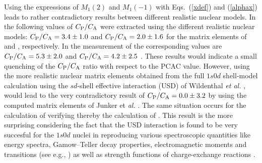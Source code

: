 \begin{multicols}{2}
Using the
expressions of $M_1(2)$ and $M_1(-1)$ with Eqs.\ (\ref{xdef}) and (\ref{alphax})
leads to rather contradictory results
between different realistic nuclear models. In \cite{bru} the following values
of $C_{\rm P}/C_{\rm A}$ were extracted using the different realistic
nuclear models: $C_{\rm P}/C_{\rm A} = 3.4\pm 1.0$ and
$C_{\rm P}/C_{\rm A} = 2.0\pm 1.6$ for the matrix elements of \cite{CIE76}
and \cite{PAR81}, respectively. In the measurement of \cite{MOF97}
the corresponding values are $C_{\rm P}/C_{\rm A} = 5.3\pm 2.0$ \cite{CIE76}
and $C_{\rm P}/C_{\rm A} = 4.2\pm 2.5$ \cite{PAR81}. These results would
indicate a small quenching of the $C_{\rm P}/C_{\rm A}$ ratio with respect
to the PCAC value. However, using the more realistic nuclear matrix elements
obtained from the full $1s0d$ shell-model calculation using
the $sd$-shell effective interaction (USD)
of Wildenthal {\em et al.} \cite{wil}, would lead to the
very contradictory result of $C_{\rm P}/C_{\rm A} = 0.0\pm 3.2$ \cite{MOF97}
by using the computed matrix elements of Junker et {\it al.} \cite{JUN95}.
The same situation occurs for the calculation of \cite{sii} verifying
thereby  the
calculation of \cite{JUN95}. This result is the more surprising considering
the fact that the USD interaction is found to be very succesful
for the $1s0d$ nuclei in reproducing various spectroscopic quantities like
energy spectra, Gamow--Teller decay properties, electromagnetic moments and
transitions (see e.g., \cite{car,bro}) as well as strength functions of
charge-exchange reactions \cite{JOH96}.


\end{multicols}
